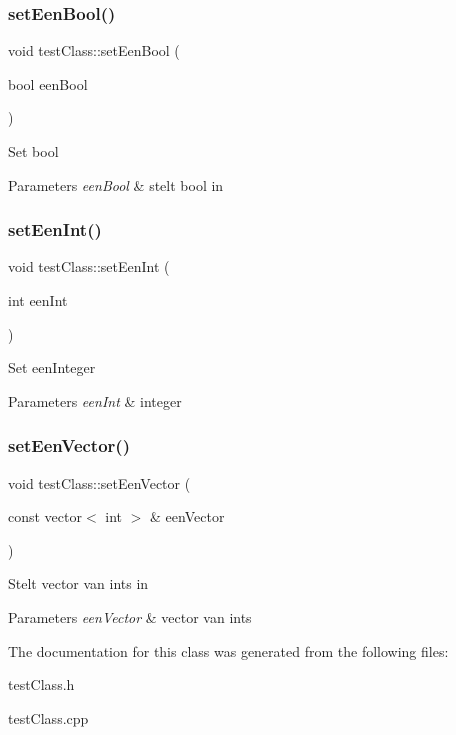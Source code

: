 \subsubsection{\texorpdfstring{set\+Een\+Bool()}{setEenBool()}}
{\footnotesize\ttfamily void test\+Class\+::set\+Een\+Bool (\begin{DoxyParamCaption}\item[{bool}]{een\+Bool }\end{DoxyParamCaption})}

Set bool 
\begin{DoxyParams}{Parameters}
{\em een\+Bool} & stelt bool in \\
\hline
\end{DoxyParams}
\mbox{\label{classtest_class_a807b103688091e9b8dff46b563411b59}} 
\subsubsection{\texorpdfstring{set\+Een\+Int()}{setEenInt()}}
{\footnotesize\ttfamily void test\+Class\+::set\+Een\+Int (\begin{DoxyParamCaption}\item[{int}]{een\+Int }\end{DoxyParamCaption})}

Set een\+Integer 
\begin{DoxyParams}{Parameters}
{\em een\+Int} & integer \\
\hline
\end{DoxyParams}
\mbox{\label{classtest_class_a0f8b2f1e5612649a54f98e004af8dc55}} 
\subsubsection{\texorpdfstring{set\+Een\+Vector()}{setEenVector()}}
{\footnotesize\ttfamily void test\+Class\+::set\+Een\+Vector (\begin{DoxyParamCaption}\item[{const vector$<$ int $>$ \&}]{een\+Vector }\end{DoxyParamCaption})}

Stelt vector van ints in 
\begin{DoxyParams}{Parameters}
{\em een\+Vector} & vector van ints \\
\hline
\end{DoxyParams}


The documentation for this class was generated from the following files\+:\begin{DoxyCompactItemize}
\item 
test\+Class.\+h\item 
test\+Class.\+cpp\end{DoxyCompactItemize}
